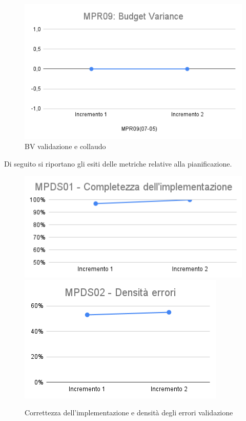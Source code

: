 \begin{figure}[h!]
	\centering
	\includegraphics[scale=0.6]{Immagini/BV_Validazione.png}
	\caption{BV validazione e collaudo}
	\label{fig:BV_Validazione}
\end{figure}
Di seguito si riportano gli esiti delle metriche relative alla pianificazione.
\begin{figure}[h!]
	\includegraphics[scale=0.6]{Immagini/MPDS01_CompletezzaImplValidazione.png}\quad
	\includegraphics[scale=0.6]{Immagini/MPDS02_DErroriValidazione.png}
	\caption{Correttezza dell'implementazione e densità degli errori validazione}
	\label{fig:DensitàErrValidazione}
\end{figure}
